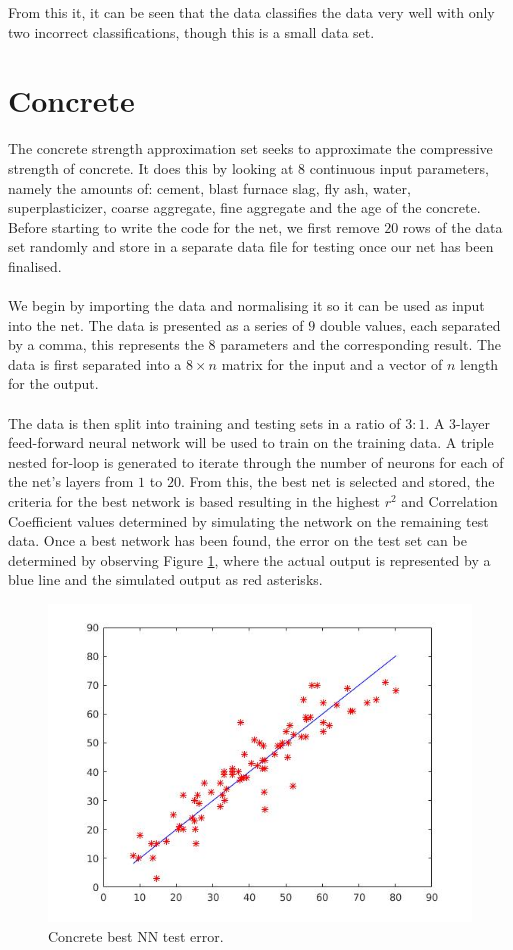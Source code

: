\documentclass{article}%
\begin{document}
From this it, it can be seen that the data classifies the data very well with only two incorrect classifications, though this is a small data set.
\section{Concrete}
The concrete strength approximation set seeks to approximate the compressive strength of concrete. It does this by looking at 8 continuous input parameters, namely the amounts of: cement, blast furnace slag, fly ash, water, superplasticizer, coarse aggregate, fine aggregate and the age of the concrete. Before starting to write the code for the net, we first remove $20$ rows of the data set randomly and store in a separate data file for testing once our net has been finalised.
\\
\\
We begin by importing the data and normalising it so it can be used as input into the net. The data is presented as a series of $9$ double values, each separated by a comma, this represents the $8$ parameters and the corresponding result. The data is first separated into a $8 \times n$ matrix for the input and a vector of $n$ length for the output.
\\
\\
The data is then split into training and testing sets in a ratio of $3:1$. A 3-layer feed-forward neural network will be used to train on the training data. A triple nested for-loop is generated to iterate through the number of neurons for each of the net's layers from $1$ to $20$. From this, the best net is selected and stored, the criteria for the best network is based resulting in the highest $r^2$ and Correlation Coefficient values determined by simulating the network on the remaining test data. Once a best network has been found, the error on the test set can be determined by observing Figure \ref{fig:contrain}, where the actual output is represented by a blue line and the simulated output as red asterisks.
\begin{figure}[H]
\centering
\includegraphics[scale=0.5]{Images/contrain.jpg}
\caption{Concrete best NN test error.}
\label{fig:contrain}
\end{figure}
\end{document}
